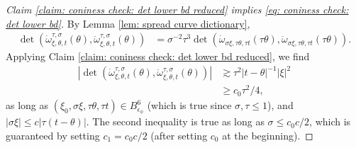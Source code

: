 \documentclass[12pt]{amsart}
\numberwithin{equation}{section}
\newcommand{\1}{\mathbbm{1}}
\newcommand{\Bphi}{B_{\epsilon_\phi}}
\begin{document}
\begin{proof}[Claim \ref{claim: coniness check: det lower bd reduced} implies \eqref{eq: coniness check: det lower bd}]
    By Lemma \ref{lem: spread curve dictionary}, 
    \begin{align}
        \det(\dot \omega^{\tau,\sigma}_{\xi, \theta, t}(\theta), \ddot \omega^{\tau,\sigma}_{\xi, \theta, t}(\theta)) &= 
        \sigma^{-2} \tau^3 \det(\dot \omega_{\sigma \xi, \tau \theta, \tau t}(\tau \theta), \ddot \omega_{\sigma \xi, \tau \theta, \tau t}(\tau \theta)).
    \end{align}
    Applying Claim \ref{claim: coniness check: det lower bd reduced}, we find 
    \begin{align}
        |\det(\dot \omega^{\tau,\sigma}_{\xi, \theta, t}(\theta), \ddot \omega^{\tau,\sigma}_{\xi, \theta, t}(\theta))| &\gtrsim \tau^2 |t - \theta|^{-1} |\xi|^2 \\
        &\geq c_0 \tau^2 / 4,
    \end{align}
    as long as $(\xi_0, \sigma \xi, \tau \theta, \tau t) \in \Bphi^6$ (which is true since $\sigma, \tau \leq 1$), and $|\sigma \xi| \leq c |\tau (t - \theta)|$. The second inequality is true as long as $\sigma \leq c_0 c/2$, which is guaranteed by setting $c_1 = c_0 c/ 2$ (after setting $c_0$ at the beginning).
\end{proof}
\end{document}

